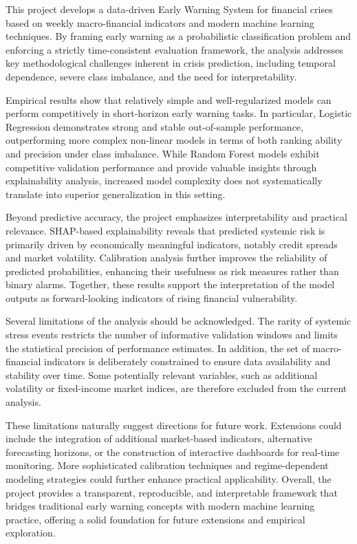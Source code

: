 \documentclass[11pt,a4paper]{article}
\begin{document}
This project develops a data-driven Early Warning System for financial crises based on weekly macro-financial indicators and modern machine learning techniques. By framing early warning as a probabilistic classification problem and enforcing a strictly time-consistent evaluation framework, the analysis addresses key methodological challenges inherent in crisis prediction, including temporal dependence, severe class imbalance, and the need for interpretability.

Empirical results show that relatively simple and well-regularized models can perform competitively in short-horizon early warning tasks. In particular, Logistic Regression demonstrates strong and stable out-of-sample performance, outperforming more complex non-linear models in terms of both ranking ability and precision under class imbalance. While Random Forest models exhibit competitive validation performance and provide valuable insights through explainability analysis, increased model complexity does not systematically translate into superior generalization in this setting.

Beyond predictive accuracy, the project emphasizes interpretability and practical relevance. SHAP-based explainability reveals that predicted systemic risk is primarily driven by economically meaningful indicators, notably credit spreads and market volatility. Calibration analysis further improves the reliability of predicted probabilities, enhancing their usefulness as risk measures rather than binary alarms. Together, these results support the interpretation of the model outputs as forward-looking indicators of rising financial vulnerability.

Several limitations of the analysis should be acknowledged. The rarity of systemic stress events restricts the number of informative validation windows and limits the statistical precision of performance estimates. In addition, the set of macro-financial indicators is deliberately constrained to ensure data availability and stability over time. Some potentially relevant variables, such as additional volatility or fixed-income market indices, are therefore excluded from the current analysis.

These limitations naturally suggest directions for future work. Extensions could include the integration of additional market-based indicators, alternative forecasting horizons, or the construction of interactive dashboards for real-time monitoring. More sophisticated calibration techniques and regime-dependent modeling strategies could further enhance practical applicability. Overall, the project provides a transparent, reproducible, and interpretable framework that bridges traditional early warning concepts with modern machine learning practice, offering a solid foundation for future extensions and empirical exploration.
\end{document}
